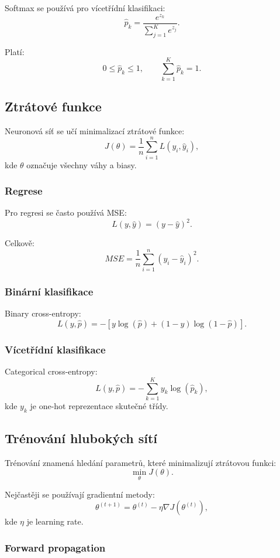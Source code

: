 Softmax se používá pro vícetřídní klasifikaci:
\[
\hat p_k =
\frac{e^{z_k}}
{\sum_{j=1}^{K} e^{z_j}}.
\]

Platí:
\[
0 \leq \hat p_k \leq 1,
\qquad
\sum_{k=1}^{K}\hat p_k=1.
\]

\subsection{Ztrátové funkce}

Neuronová síť se učí minimalizací ztrátové funkce:
\[
J(\theta)
=
\frac{1}{n}
\sum_{i=1}^n
L(y_i,\hat y_i),
\]
kde $\theta$ označuje všechny váhy a biasy.

\subsubsection{Regrese}

Pro regresi se často používá MSE:
\[
L(y,\hat y)=(y-\hat y)^2.
\]

Celkově:
\[
MSE=
\frac{1}{n}
\sum_{i=1}^{n}
(y_i-\hat y_i)^2.
\]

\subsubsection{Binární klasifikace}

Binary cross-entropy:
\[
L(y,\hat p)
=
-\left[
y\log(\hat p)
+
(1-y)\log(1-\hat p)
\right].
\]

\subsubsection{Vícetřídní klasifikace}

Categorical cross-entropy:
\[
L(y,\hat p)
=
-\sum_{k=1}^{K} y_k\log(\hat p_k),
\]
kde $y_k$ je one-hot reprezentace skutečné třídy.

\subsection{Trénování hlubokých sítí}

Trénování znamená hledání parametrů, které minimalizují ztrátovou funkci:
\[
\min_{\theta} J(\theta).
\]

Nejčastěji se používají gradientní metody:
\[
\theta^{(t+1)}
=
\theta^{(t)}
-
\eta \nabla J(\theta^{(t)}),
\]
kde $\eta$ je learning rate.

\subsubsection{Forward propagation}

